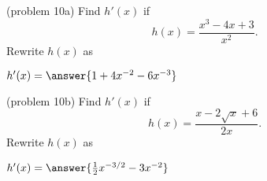\documentclass{ximera}
\begin{document}
\begin{problem}(problem 10a)
Find $h'(x)$ if 
\[
h(x) = \frac{x^3 - 4x + 3}{x^2}.
\]
Rewrite $h(x)$ as
\begin{multipleChoice}
\end{multipleChoice}

$h'(x) = \answer{1 + 4x^{-2} -6x^{-3}}$

\end{problem}



\begin{problem}(problem 10b)
Find $h'(x)$ if 
\[
h(x) = \frac{x - 2\sqrt{x} + 6}{2x}.
\]
Rewrite $h(x)$ as
\begin{multipleChoice}
\end{multipleChoice}

$h'(x) = \answer{\frac12 x^{-3/2} -3x^{-2}}$

\end{problem}




\begin{center}
\begin{foldable}
\end{foldable}
\end{center}
\end{document}
